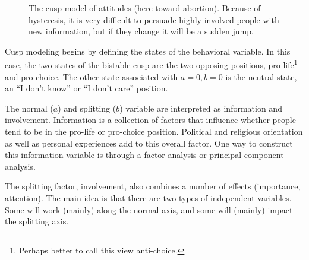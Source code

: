 \documentclass[
  a4paper,
  DIV=11,
  numbers=noendperiod,
  oneside]{scrreprt}
\begin{document}
\begin{figure}


\caption{\label{fig-ch3-img13-old-25}The cusp model of attitudes (here
toward abortion). Because of hysteresis, it is very difficult to
persuade highly involved people with new information, but if they change
it will be a sudden jump.}

\end{figure}%

Cusp modeling begins by defining the states of the behavioral variable.
In this case, the two states of the bistable cusp are the two opposing
positions, pro-life\footnote{Perhaps better to call this view
  anti-choice.} and pro-choice. The other state associated with
\(a = 0, b = 0\) is the neutral state, an ``I don't know'' or ``I don't
care'' position.

The normal (\(a\)) and splitting (\(b\)) variable are interpreted as
information and involvement. Information is a collection of factors that
influence whether people tend to be in the pro-life or pro-choice
position. Political and religious orientation as well as personal
experiences add to this overall factor. One way to construct this
information variable is through a factor analysis or principal component
analysis.

The splitting factor, involvement, also combines a number of effects
(importance, attention). The main idea is that there are two types of
independent variables. Some will work (mainly) along the normal axis,
and some will (mainly) impact the splitting axis.
\end{document}
